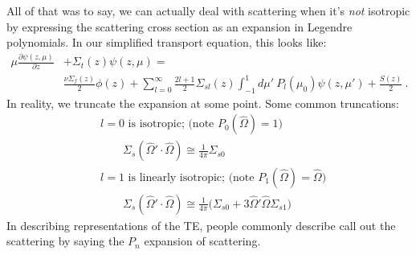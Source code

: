 \documentclass[12pt]{article}
\newcommand{\vOmega}{\ensuremath{\hat{\Omega}}}
\begin{document}
All of that was to say, we can actually deal with scattering when it's \textit{not} isotropic by expressing the scattering cross section as an expansion in Legendre polynomials. In our simplified transport equation, this looks like:
\begin{align*}
\mu \frac{\partial \psi(z, \mu)}{\partial z} &+ \Sigma_t(z)\psi(z, \mu) = \\
&\frac{\nu\Sigma_f(z) }{2}\phi(z) +  \sum_{l=0}^{\infty} \frac{2l+1}{2} \Sigma_{sl}(z) \int_{-1}^1 d\mu'\: P_l(\mu_0) \psi(z, \mu')  + \frac{S(z)}{2} \:.
\end{align*}
%
In reality, we truncate the expansion at some point. Some common truncations:
\begin{align*}
&l=0 \text{ is isotropic; (note } P_0 (\vOmega) = 1 \text{)}\\
&\qquad \Sigma_s(\vOmega' \cdot \vOmega) \cong \frac{1}{4\pi}\Sigma_{s0} \\
%
&l=1 \text{ is linearly isotropic; (note } P_1 (\vOmega) = \vOmega \text{)}\\
&\qquad \Sigma_s(\vOmega' \cdot \vOmega) \cong \frac{1}{4\pi}\bigl( \Sigma_{s0} + 3\vOmega' \vOmega \Sigma_{s1} \bigr) 
\end{align*}
%
In describing representations of the TE, people commonly describe call out the scattering by saying the $P_n$ expansion of scattering. 
\end{document}

